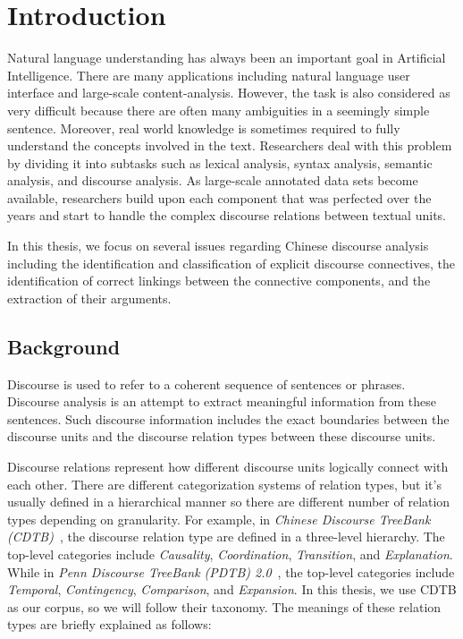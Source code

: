 %
%
%
\chapter{Introduction}
\label{c:intro}

Natural language understanding has always been an important goal in Artificial
Intelligence. There are many applications including natural language user
interface and large-scale content-analysis. However, the task is also considered
as very difficult because there are often many ambiguities in a seemingly
simple sentence. Moreover, real world knowledge is sometimes required to fully
understand the concepts involved in the text. Researchers deal with this problem by dividing it into subtasks such as lexical
analysis, syntax analysis, semantic analysis, and discourse analysis.
As large-scale annotated data sets become available, researchers build
upon each component that was perfected over the years and start to handle the
complex discourse relations between textual units.

In this thesis, we focus on several issues regarding Chinese discourse analysis
including the identification and classification of explicit discourse connectives,
the identification of correct linkings between the connective components, and the extraction
of their arguments. 

%
%
\section{Background}

Discourse is used to refer to a coherent sequence of sentences or phrases.
Discourse analysis is an attempt to extract meaningful information from
these sentences. Such discourse information includes the exact boundaries
between the discourse units and the discourse relation types between
these discourse units.

Discourse relations represent how different discourse units logically connect
with each other.  There are different categorization systems of relation types, but
it's usually defined in a hierarchical manner so there are different number
of relation types depending on granularity. For example, in
\textit{Chinese Discourse TreeBank (CDTB)}~\citep{li2014building}, the discourse
relation type are defined in a three-level hierarchy. The top-level categories
include \textit{Causality}, \textit{Coordination}, \textit{Transition},
and \textit{Explanation}.
While in \textit{Penn Discourse TreeBank (PDTB) 2.0}~\citep{Prasad08thepenn},
the top-level categories include \textit{Temporal}, \textit{Contingency},
\textit{Comparison}, and \textit{Expansion}. In this thesis, we use
CDTB as our corpus, so we will follow their taxonomy. The meanings of these
relation types are briefly explained as follows:

